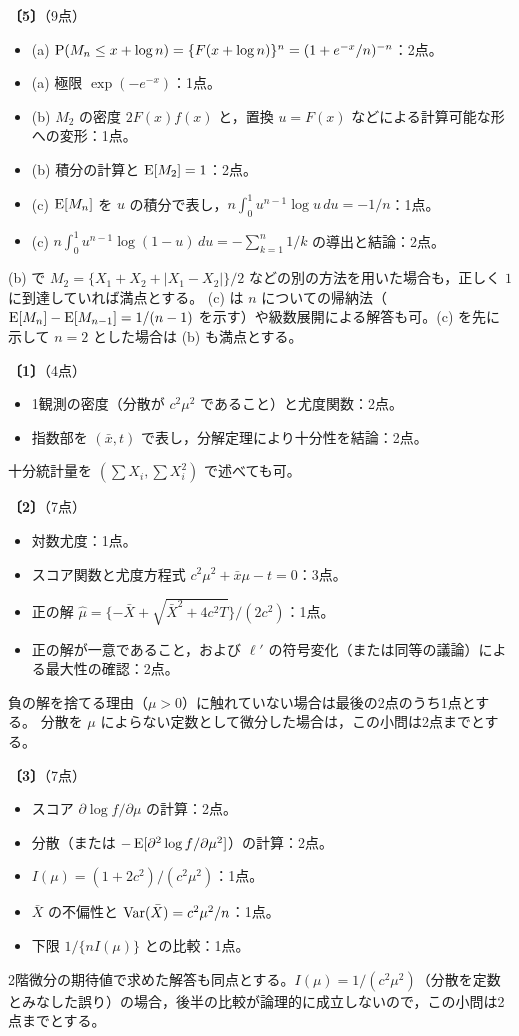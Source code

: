 \documentclass[a4paper,11pt]{ltjsarticle}
\renewcommand{\ans}[1]{\par\medskip\noindent\textbf{〔#1〕}\quad}
\renewcommand{\points}[1]{\hfill\textnormal{（#1点）}\par\nobreak}
\begin{document}
\ans{5}\points{9}
\begin{itemize}
\item (a) $\operatorname{P}(M_n\le x+\log n)=\{F(x+\log n)\}^n=(1+e^{-x}/n)^{-n}$：2点。
\item (a) 極限 $\exp(-e^{-x})$：1点。
\item (b) $M_2$ の密度 $2F(x)f(x)$ と，置換 $u=F(x)$ などによる計算可能な形への変形：1点。
\item (b) 積分の計算と $\operatorname{E}[M_2]=1$：2点。
\item (c) $\operatorname{E}[M_n]$ を $u$ の積分で表し，$n\int_0^1u^{n-1}\log u\,du=-1/n$：1点。
\item (c) $n\int_0^1u^{n-1}\log(1-u)\,du=-\sum_{k=1}^n1/k$ の導出と結論：2点。
\end{itemize}
(b) で $M_2=\{X_1+X_2+|X_1-X_2|\}/2$ などの別の方法を用いた場合も，正しく $1$ に到達していれば満点とする。
(c) は $n$ についての帰納法（$\operatorname{E}[M_n]-\operatorname{E}[M_{n-1}]=1/(n-1)$ を示す）や級数展開による解答も可。(c) を先に示して $n=2$ とした場合は (b) も満点とする。
\newpage

\ans{1}\points{4}
\begin{itemize}
\item 1観測の密度（分散が $c^2\mu^2$ であること）と尤度関数：2点。
\item 指数部を $(\bar x,t)$ で表し，分解定理により十分性を結論：2点。
\end{itemize}
十分統計量を $(\sum X_i,\sum X_i^2)$ で述べても可。

\ans{2}\points{7}
\begin{itemize}
\item 対数尤度：1点。
\item スコア関数と尤度方程式 $c^2\mu^2+\bar x\mu-t=0$：3点。
\item 正の解 $\hat\mu=\{-\bar X+\sqrt{\bar X^2+4c^2T}\}/(2c^2)$：1点。
\item 正の解が一意であること，および $\ell'$ の符号変化（または同等の議論）による最大性の確認：2点。
\end{itemize}
負の解を捨てる理由（$\mu>0$）に触れていない場合は最後の2点のうち1点とする。
分散を $\mu$ によらない定数として微分した場合は，この小問は2点までとする。

\ans{3}\points{7}
\begin{itemize}
\item スコア $\partial\log f/\partial\mu$ の計算：2点。
\item 分散（または $-\operatorname{E}[\partial^2\log f/\partial\mu^2]$）の計算：2点。
\item $I(\mu)=(1+2c^2)/(c^2\mu^2)$：1点。
\item $\bar X$ の不偏性と $\operatorname{Var}(\bar X)=c^2\mu^2/n$：1点。
\item 下限 $1/\{nI(\mu)\}$ との比較：1点。
\end{itemize}
2階微分の期待値で求めた解答も同点とする。$I(\mu)=1/(c^2\mu^2)$（分散を定数とみなした誤り）の場合，後半の比較が論理的に成立しないので，この小問は2点までとする。
\end{document}
